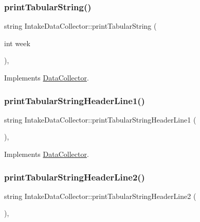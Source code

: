 \subsubsection{\texorpdfstring{print\+Tabular\+String()}{printTabularString()}}
{\footnotesize\ttfamily string Intake\+Data\+Collector\+::print\+Tabular\+String (\begin{DoxyParamCaption}\item[{int}]{week }\end{DoxyParamCaption})\hspace{0.3cm}{\ttfamily [override]}, {\ttfamily [virtual]}}



Implements \mbox{\hyperlink{classDataCollector_a397fccabe0223267eea8fc7cac0e59da}{Data\+Collector}}.

\mbox{\label{classIntakeDataCollector_ae17ab7e6c75e77f5981f6a682597bb5c}} 
\subsubsection{\texorpdfstring{print\+Tabular\+String\+Header\+Line1()}{printTabularStringHeaderLine1()}}
{\footnotesize\ttfamily string Intake\+Data\+Collector\+::print\+Tabular\+String\+Header\+Line1 (\begin{DoxyParamCaption}{ }\end{DoxyParamCaption})\hspace{0.3cm}{\ttfamily [override]}, {\ttfamily [virtual]}}



Implements \mbox{\hyperlink{classDataCollector_a91619cfa9e9b8cefd2f7c20d5718b41e}{Data\+Collector}}.

\mbox{\label{classIntakeDataCollector_a2855eb8eed71649309bd4d9336f258c0}} 
\subsubsection{\texorpdfstring{print\+Tabular\+String\+Header\+Line2()}{printTabularStringHeaderLine2()}}
{\footnotesize\ttfamily string Intake\+Data\+Collector\+::print\+Tabular\+String\+Header\+Line2 (\begin{DoxyParamCaption}{ }\end{DoxyParamCaption})\hspace{0.3cm}{\ttfamily [override]}, {\ttfamily [virtual]}}



